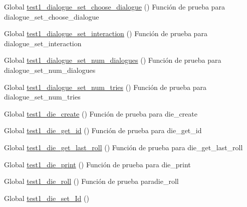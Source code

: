 \begin{DoxyRefList}
\item[Global \mbox{\hyperlink{dialogue__test_8c_a9f3edb11264f9597bdb2fc47ac2d1f32}{test1\+\_\+dialogue\+\_\+set\+\_\+choose\+\_\+dialogue}} ()]\label{test__test000041}%
%
Función de prueba para dialogue\+\_\+set\+\_\+choose\+\_\+dialogue  
\item[Global \mbox{\hyperlink{dialogue__test_8c_ad9946bd1bd53b729657f8b06bacfeb3e}{test1\+\_\+dialogue\+\_\+set\+\_\+interaction}} ()]\label{test__test000046}%
%
Función de prueba para dialogue\+\_\+set\+\_\+interaction  
\item[Global \mbox{\hyperlink{dialogue__test_8c_a34b7e470fa638f64241a388b9f180845}{test1\+\_\+dialogue\+\_\+set\+\_\+num\+\_\+dialogues}} ()]\label{test__test000036}%
%
Función de prueba para dialogue\+\_\+set\+\_\+num\+\_\+dialogues  
\item[Global \mbox{\hyperlink{dialogue__test_8c_ac07f19fa039babf738bc6209c26a865a}{test1\+\_\+dialogue\+\_\+set\+\_\+num\+\_\+tries}} ()]\label{test__test000031}%
%
Función de prueba para dialogue\+\_\+set\+\_\+num\+\_\+tries  
\item[Global \mbox{\hyperlink{die__test_8c_ac0b610468bd3d3b358051c966b771431}{test1\+\_\+die\+\_\+create}} ()]\label{test__test000051}%
%
Función de prueba para die\+\_\+create  
\item[Global \mbox{\hyperlink{die__test_8c_ad27d80a80c4b4fa108337135d5633c90}{test1\+\_\+die\+\_\+get\+\_\+id}} ()]\label{test__test000060}%
%
Función de prueba para die\+\_\+get\+\_\+id  
\item[Global \mbox{\hyperlink{die__test_8c_a99e873ecce6a19186919e991876dadbe}{test1\+\_\+die\+\_\+get\+\_\+last\+\_\+roll}} ()]\label{test__test000058}%
%
Función de prueba para die\+\_\+get\+\_\+last\+\_\+roll  
\item[Global \mbox{\hyperlink{die__test_8c_a4cd7590bbb2edca1414f083ba74ec542}{test1\+\_\+die\+\_\+print}} ()]\label{test__test000062}%
%
Función de prueba para die\+\_\+print  
\item[Global \mbox{\hyperlink{die__test_8c_ac005cb42fa33b38a79896934a5a50001}{test1\+\_\+die\+\_\+roll}} ()]\label{test__test000053}%
%
Función de prueba paradie\+\_\+roll  
\item[Global \mbox{\hyperlink{die__test_8c_aca1dfa20f42a3a4360ac83b32284e11b}{test1\+\_\+die\+\_\+set\+\_\+\+Id}} ()]\label{test__test000055}%

\end{DoxyRefList}

